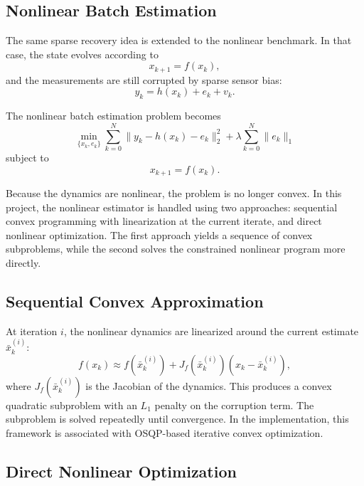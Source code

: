 \documentclass[conference]{IEEEtran}
\begin{document}
\subsection{Nonlinear Batch Estimation}

The same sparse recovery idea is extended to the nonlinear benchmark. In that case, the state evolves according to
\begin{equation}
x_{k+1} = f(x_k),
\end{equation}
and the measurements are still corrupted by sparse sensor bias:
\begin{equation}
y_k = h(x_k) + e_k + v_k.
\end{equation}

The nonlinear batch estimation problem becomes
\begin{equation}
\min_{\{x_k,e_k\}} \sum_{k=0}^{N} \|y_k - h(x_k) - e_k\|_2^2 + \lambda \sum_{k=0}^{N}\|e_k\|_1
\end{equation}
subject to
\begin{equation}
x_{k+1} = f(x_k).
\end{equation}

Because the dynamics are nonlinear, the problem is no longer convex. In this project, the nonlinear estimator is handled using two approaches: sequential convex programming with linearization at the current iterate, and direct nonlinear optimization. The first approach yields a sequence of convex subproblems, while the second solves the constrained nonlinear program more directly.

\subsection{Sequential Convex Approximation}

At iteration $i$, the nonlinear dynamics are linearized around the current estimate $\bar{x}_k^{(i)}$:
\begin{equation}
f(x_k) \approx f(\bar{x}_k^{(i)}) + J_f(\bar{x}_k^{(i)})(x_k - \bar{x}_k^{(i)}),
\end{equation}
where $J_f(\bar{x}_k^{(i)})$ is the Jacobian of the dynamics. This produces a convex quadratic subproblem with an $L_1$ penalty on the corruption term. The subproblem is solved repeatedly until convergence. In the implementation, this framework is associated with OSQP-based iterative convex optimization. %

\subsection{Direct Nonlinear Optimization}
\end{document}
